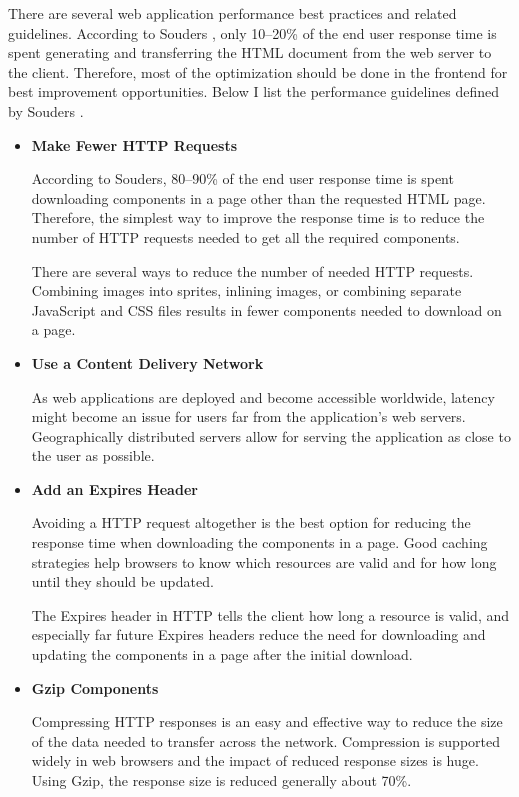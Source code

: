 There are several web application performance best practices and
related guidelines. According to Souders \cite{souders2007high}, only
10--20\% of the end user response time is spent generating and
transferring the HTML document from the web server to the
client. Therefore, most of the optimization should be done in the
frontend for best improvement opportunities. Below I list the
performance guidelines defined by Souders \cite{souders2007high}.

\begin{itemize}


\item \textbf{Make Fewer HTTP Requests}

  According to Souders, 80--90\% of the end user response time is
  spent downloading components in a page other than the requested HTML
  page. Therefore, the simplest way to improve the response time is to
  reduce the number of HTTP requests needed to get all the required
  components.

  There are several ways to reduce the number of needed HTTP
  requests. Combining images into sprites, inlining images, or
  combining separate JavaScript and CSS files results in fewer
  components needed to download on a page.

\item \textbf{Use a Content Delivery Network}

  As web applications are deployed and become accessible worldwide,
  latency might become an issue for users far from the application's
  web servers. Geographically distributed servers allow for serving
  the application as close to the user as possible.

\item \textbf{Add an Expires Header}

  Avoiding a HTTP request altogether is the best option for reducing
  the response time when downloading the components in a page. Good
  caching strategies help browsers to know which resources are valid
  and for how long until they should be updated.

  The Expires header in HTTP tells the client how long a resource is
  valid, and especially far future Expires headers reduce the need for
  downloading and updating the components in a page after the initial
  download.

\item \textbf{Gzip Components}

  Compressing HTTP responses is an easy and effective way to reduce
  the size of the data needed to transfer across the
  network. Compression is supported widely in web browsers and the
  impact of reduced response sizes is huge. Using Gzip, the response
  size is reduced generally about 70\%.


\end{itemize}
